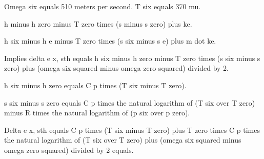 Omega six equals 510 meters per second. T six equals 370 mu. 

h minus h zero minus T zero times (s minus s zero) plus ke.

h six minus h e minus T zero times (s six minus s e) plus m dot ke.

Implies delta e x, sth equals h six minus h zero minus T zero times (s six minus s zero) plus (omega six squared minus omega zero squared) divided by 2.

h six minus h zero equals C p times (T six minus T zero).

s six minus s zero equals C p times the natural logarithm of (T six over T zero) minus R times the natural logarithm of (p six over p zero).

Delta e x, sth equals C p times (T six minus T zero) plus T zero times C p times the natural logarithm of (T six over T zero) plus (omega six squared minus omega zero squared) divided by 2 equals.
